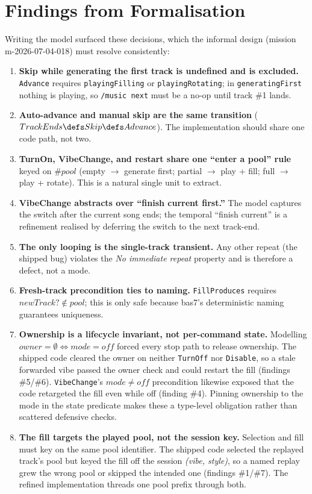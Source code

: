 \documentclass[a4paper,10pt,fleqn]{article}
\begin{document}
\section{Findings from Formalisation}
\label{sec:findings}

Writing the model surfaced these decisions, which the informal design
(mission m-2026-07-04-018) must resolve consistently:

\begin{enumerate}
  \item \textbf{Skip while generating the first track is undefined and is
    excluded.} \texttt{Advance} requires \texttt{playingFilling} or
    \texttt{playingRotating}; in \texttt{generatingFirst} nothing is
    playing, so \texttt{/music next} must be a no-op until track \#1
    lands.
  \item \textbf{Auto-advance and manual skip are the same transition}
    ($TrackEnds \defs Skip \defs Advance$). The implementation should
    share one code path, not two.
  \item \textbf{TurnOn, VibeChange, and restart share one ``enter a pool''
    rule} keyed on $\# pool$ (empty $\to$ generate first; partial $\to$
    play + fill; full $\to$ play + rotate). This is a natural single
    unit to extract.
  \item \textbf{VibeChange abstracts over ``finish current first.''} The
    model captures the switch after the current song ends; the temporal
    ``finish current'' is a refinement realised by deferring the switch
    to the next track-end.
  \item \textbf{The only looping is the single-track transient.} Any other
    repeat (the shipped bug) violates the \emph{No immediate repeat}
    property and is therefore a defect, not a mode.
  \item \textbf{Fresh-track precondition ties to naming.}
    \texttt{FillProduces} requires $newTrack? \notin pool$; this is only
    safe because bas7's deterministic naming guarantees uniqueness.
  \item \textbf{Ownership is a lifecycle invariant, not per-command
    state.} Modelling $owner = \emptyset \iff mode = off$ forced every
    stop path to release ownership. The shipped code cleared the owner on
    neither \texttt{TurnOff} nor \texttt{Disable}, so a stale forwarded
    vibe passed the owner check and could restart the fill (findings
    \#5/\#6). \texttt{VibeChange}'s $mode \neq off$ precondition likewise
    exposed that the code retargeted the fill even while off (finding
    \#4). Pinning ownership to the mode in the state predicate makes these
    a type-level obligation rather than scattered defensive checks.
  \item \textbf{The fill targets the played pool, not the session key.}
    Selection and fill must key on the same pool identifier. The shipped
    code selected the replayed track's pool but keyed the fill off the
    session \emph{(vibe, style)}, so a named replay grew the wrong pool
    or skipped the intended one (findings \#1/\#7). The refined
    implementation threads one pool prefix through both.
\end{enumerate}
\end{document}
